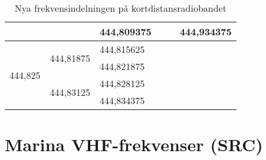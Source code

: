 \begin{table}[H]
\begin{tabular}{|l|l|l|l|l|l|}
		                                               &                                                 & 444,809375                      & \multicolumn{1}{l|}{}                         & \multicolumn{1}{l|}{}                           & \multicolumn{1}{l|}{444,934375} \\ \hline
		\multirow{4}{*}{444,825}                       & \multirow{2}{*}{444,81875}                      & 444,815625                      & \multicolumn{3}{l}{\multirow{4}{*}{}}                                                                                             \\ \cline{3-3}
		                                               &                                                 & 444,821875                      & \multicolumn{3}{l}{}                                                                                                              \\ \cline{2-3}
		                                               & \multirow{2}{*}{444,83125}                      & 444,828125                      & \multicolumn{3}{l}{}                                                                                                              \\ \cline{3-3}
		                                               &                                                 & 444,834375                      & \multicolumn{3}{l}{}                                                                                                              \\ \cline{1-3}
	\end{tabular}
\caption{Nya frekvensindelningen på kortdistansradiobandet}
\label{tab:SRBR-frekvenser}
\end{table}

\section{Marina VHF-frekvenser (SRC)}

